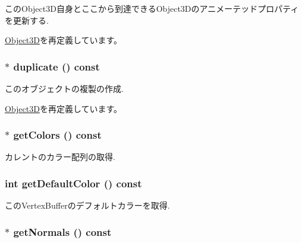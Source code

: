 このObject3D自身とここから到達できるObject3Dのアニメーテッドプロパティを更新する. 

\hyperlink{classm3g_1_1Object3D_8aad1ceab4c2a03609c8a42324ce484d}{Object3D}を再定義しています。\hypertarget{classm3g_1_1VertexBuffer_d069984e7455bfe074cab9497b47cadf}{
\subsubsection[{duplicate}]{ $\ast$ duplicate () const}}
\label{classm3g_1_1VertexBuffer_d069984e7455bfe074cab9497b47cadf}


このオブジェクトの複製の作成. 

\hyperlink{classm3g_1_1Object3D_a25110dac934f867b83b73ad4741a0f4}{Object3D}を再定義しています。\hypertarget{classm3g_1_1VertexBuffer_e3bdc8503242a6d278230352d03e5893}{
\subsubsection[{getColors}]{ $\ast$ getColors () const}}
\label{classm3g_1_1VertexBuffer_e3bdc8503242a6d278230352d03e5893}


カレントのカラー配列の取得. \hypertarget{classm3g_1_1VertexBuffer_4e33b93a98ce0632d51e7ae775ae5b1e}{
\subsubsection[{getDefaultColor}]{\setlength{\rightskip}{0pt plus 5cm}int getDefaultColor () const}}
\label{classm3g_1_1VertexBuffer_4e33b93a98ce0632d51e7ae775ae5b1e}


このVertexBufferのデフォルトカラーを取得. \hypertarget{classm3g_1_1VertexBuffer_0f4341d1215ff8f4efeaa40a21327c0c}{
\subsubsection[{getNormals}]{ $\ast$ getNormals () const}}
\label{classm3g_1_1VertexBuffer_0f4341d1215ff8f4efeaa40a21327c0c}


